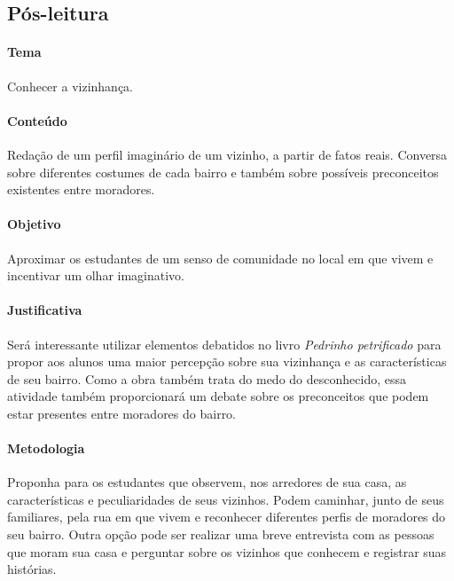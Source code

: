\documentclass[11pt]{extarticle}
\begin{document}
\subsection{Pós-leitura}


\paragraph{Tema} Conhecer a vizinhança.

\paragraph{Conteúdo} Redação de um perfil imaginário de um vizinho, a partir de fatos reais. Conversa sobre diferentes costumes de cada bairro e também sobre possíveis preconceitos existentes entre moradores.

\paragraph{Objetivo} Aproximar os estudantes de um senso de comunidade no local em que vivem e incentivar um olhar imaginativo.

\paragraph{Justificativa} Será interessante utilizar elementos debatidos no livro \textit{Pedrinho petrificado} para propor aos alunos uma maior percepção sobre sua vizinhança e as características de seu bairro. Como a obra também trata do medo do desconhecido, essa atividade também proporcionará um debate sobre os preconceitos que podem estar presentes entre moradores do bairro.

\paragraph{Metodologia} Proponha para os estudantes que observem, nos arredores de sua casa, as características e peculiaridades de seus vizinhos. Podem caminhar, junto de seus familiares, pela rua em que vivem e reconhecer diferentes perfis de moradores do seu bairro. Outra opção pode ser realizar uma breve entrevista com as pessoas que moram sua casa e perguntar sobre os vizinhos que conhecem e registrar suas histórias.
\end{document}
